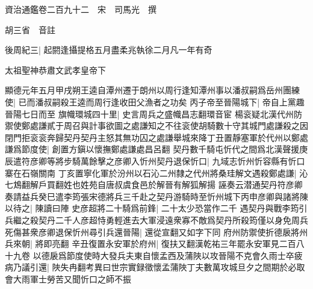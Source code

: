 資治通鑑卷二百九十二　宋　司馬光　撰

胡三省　音註

後周紀三|{
	起閼逢攝提格五月盡柔兆執徐二月凡一年有奇}


太祖聖神恭肅文武孝皇帝下

顯德元年五月甲戌朔王逵自潭州遷于朗州以周行逢知潭州事以潘叔嗣爲岳州團練使|{
	已而潘叔嗣殺王逵而周行逢收田父漁者之功矣}
丙子帝至晉陽城下|{
	帝自上黨趣晉陽七日而至}
旗幟環城四十里|{
	史言周兵之盛幟昌志翻環音宦}
楊衮疑北漢代州防禦使鄭處謙貳于周召與計事欲圖之處謙知之不往衮使胡騎數十守其城門處謙殺之因閉門拒衮衮奔歸契丹契丹主怒其無功囚之處謙舉城來降丁丑置靜塞軍於代州以鄭處謙爲節度使|{
	創置方鎭以懷撫鄭處謙處昌呂翻}
契丹數千騎屯忻代之間爲北漢聲援庚辰遣符彦卿等將步騎萬餘擊之彦卿入忻州契丹退保忻口|{
	九域志忻州忻容縣有忻口寨在石嶺關南}
丁亥置寧化軍於汾州以石沁二州隸之代州將桑珪解文遇殺鄭處謙|{
	沁七鴆翻解戶買翻姓也姓苑自唐叔虞食邑於解晉有解狐解揚}
誣奏云潜通契丹符彦卿奏請益兵癸巳遣李筠張宋德將兵三千赴之契丹游騎時至忻州城下丙申彦卿與諸將陳以待之|{
	陳讀曰陣}
史彦超將二十騎爲前鋒|{
	二十太少恐當作二千}
遇契丹與戰李筠引兵繼之殺契丹二千人彦超恃勇輕進去大軍浸遠衆寡不敵爲契丹所殺筠僅以身免周兵死傷甚衆彦卿退保忻州尋引兵還晉陽|{
	還從宣翻又如字下同}
府州防禦使折德扆將州兵來朝|{
	將即亮翻}
辛丑復置永安軍於府州|{
	復扶又翻漢乾祐三年罷永安軍見二百八十九卷}
以德扆爲節度使時大發兵夫東自懷孟西及蒲陜以攻晉陽不克會久雨士卒疲病乃議引還|{
	陜失冉翻考異曰世宗實録徵懷孟蒲陜丁夫數萬攻城旦夕之間期於必取會大雨軍士勞苦又聞忻口之師不振}


